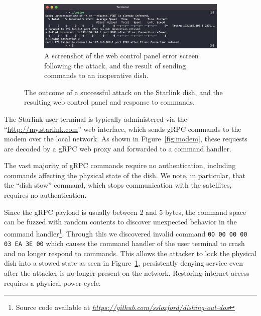 \begin{figure}
\begin{subfigure}{.52011\textwidth}
        \centering\includegraphics[width=\textwidth]{img/unstow.png}
        \caption{A screenshot of the web control panel error screen following the attack, and the result of sending commands to an inoperative dish.}
    \end{subfigure}
\caption{The outcome of a successful attack on the Starlink dish, and the resulting web control panel and response to commands.}
\label{fig:attack-outcome}
\vspace{-1.5em}
\end{figure}

The Starlink user terminal is typically administered via the ``\url{http://my.starlink.com}'' web interface, which sends gRPC commands to the modem over the local network.
As shown in Figure~\ref{fig:modem}, these requests are decoded by a gRPC web proxy and forwarded to a command handler.

The vast majority of gRPC commands require no authentication, including commands affecting the physical state of the dish.
We note, in particular, that the ``dish stow'' command, which stops communication with the satellites, requires no authentication.

Since the gRPC payload is usually between 2 and 5 bytes, the command space can be fuzzed with random contents to discover unexpected behavior in the command handler\footnote{Source code available at \textit{\url{https://github.com/ssloxford/dishing-out-dos}}}.
Through this we discovered invalid command \lstinline{00 00 00 00 03 EA 3E 00} which causes the command handler of the user terminal to crash and no longer respond to commands.
This allows the attacker to lock the physical dish into a stowed state as seen in Figure~\ref{fig:attack-outcome}, persistently denying service even after the attacker is no longer present on the network.
Restoring internet access requires a physical power-cycle.
